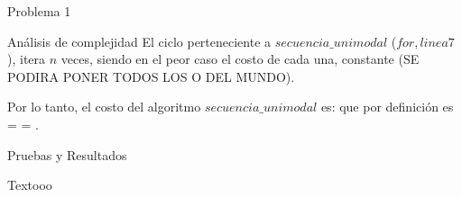 \begin{section}{Problema 1}
\begin{subsection}{Análisis de complejidad}
		El ciclo perteneciente a $secuencia\_unimodal$ ($for, linea 7$), itera $n$ veces, siendo en el peor caso el costo de cada una, 
		constante (SE PODIRA PONER TODOS LOS O DEL MUNDO).

		Por lo tanto, el costo del algoritmo $secuencia\_unimodal$ es:  que por definición es 
		 =  = .
		
	\end{subsection}


	\begin{subsection}{Pruebas y Resultados}
		
		Textooo


	\end{subsection}

\end{section}

